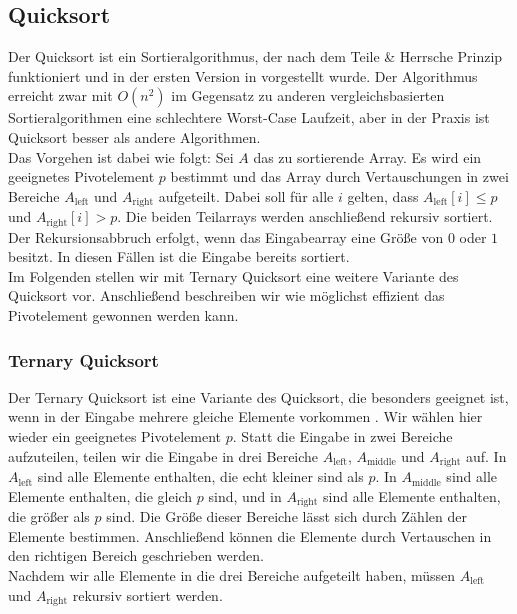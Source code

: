 \subsection{Quicksort}
\label{section:quicksort}

Der  Quicksort ist ein Sortieralgorithmus, der nach dem Teile \& Herrsche Prinzip funktioniert und in der ersten Version in \cite{quicksort} vorgestellt wurde. Der Algorithmus erreicht zwar mit $O(n^2)$ im Gegensatz zu anderen vergleichsbasierten Sortieralgorithmen eine schlechtere Worst-Case Laufzeit, aber in der Praxis ist Quicksort besser als andere Algorithmen. \\
Das Vorgehen ist dabei wie folgt: Sei $A$ das zu sortierende Array. Es wird ein geeignetes Pivotelement $p$ bestimmt und das Array durch Vertauschungen in zwei Bereiche $A_{\text{left}}$ und $A_{\text{right}}$ aufgeteilt. Dabei soll für alle $i$ gelten, dass $A_{\text{left}}[i] \le p$ und $A_{\text{right}}[i] > p$. Die beiden Teilarrays werden anschließend rekursiv sortiert. Der Rekursionsabbruch erfolgt, wenn das Eingabearray eine Größe von $0$ oder $1$ besitzt. In diesen Fällen ist die Eingabe bereits sortiert. \\

Im Folgenden stellen wir mit Ternary Quicksort eine weitere Variante des Quicksort vor. Anschließend beschreiben wir wie möglichst effizient das Pivotelement gewonnen werden kann. \\


\subsubsection{Ternary Quicksort}
\label{section:ternary_quicksort}

Der Ternary Quicksort ist eine Variante des Quicksort, die besonders geeignet ist, wenn in der Eingabe mehrere gleiche Elemente vorkommen \cite{ternary_quicksort}. Wir wählen hier wieder ein geeignetes Pivotelement $p$. Statt die Eingabe in zwei Bereiche aufzuteilen, teilen wir die Eingabe in drei Bereiche $A_{\text{left}}$, $A_{\text{middle}}$ und $A_{\text{right}}$ auf. In $A_{\text{left}}$ sind alle Elemente enthalten, die echt kleiner sind als $p$. In $A_{\text{middle}}$ sind alle Elemente enthalten, die gleich $p$ sind, und in $A_{\text{right}}$ sind alle Elemente enthalten, die größer als $p$ sind. Die Größe dieser Bereiche lässt sich durch Zählen der Elemente bestimmen. Anschließend können die Elemente durch Vertauschen in den richtigen Bereich geschrieben werden. \\
Nachdem wir alle Elemente in die drei Bereiche aufgeteilt haben, müssen $A_{\text{left}}$ und $A_{\text{right}}$ rekursiv sortiert werden. \\


